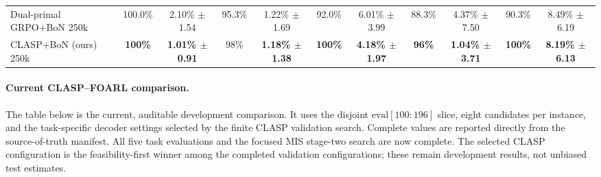 \documentclass{article}
\theoremstyle{remark}
\begin{document}
\begin{table}[t]
{\begin{tabular}{lcccccccccc}
Dual-primal GRPO+BoN 250k & 100.0\% & 2.10\% $\pm$ 1.54 & 95.3\% & 1.22\% $\pm$ 1.69 & 92.0\% & 6.01\% $\pm$ 3.99 & 88.3\% & 4.37\% $\pm$ 7.50 & 90.3\% & 8.49\% $\pm$ 6.19 \\
CLASP+BoN (ours) 250k & \textbf{100\%} & \textbf{1.01\% $\pm$ 0.91} & 98\% & \textbf{1.18\% $\pm$ 1.38} & \textbf{100\%} & \textbf{4.18\% $\pm$ 1.97} & \textbf{96\%} & \textbf{1.04\% $\pm$ 3.71} & \textbf{100\%} & \textbf{8.19\% $\pm$ 6.13} \\
\bottomrule
\end{tabular}%
}
\end{table}

\paragraph{Current CLASP--FOARL comparison.}
The table below is the current, auditable development comparison. It uses the
disjoint \(\mathrm{eval}[100{:}196]\) slice, eight candidates per instance, and
the task-specific decoder settings selected by the finite CLASP validation
search. Complete values are reported directly from the source-of-truth
manifest. All five task evaluations and the focused MIS stage-two search are
now complete. The selected CLASP configuration is the feasibility-first winner
among the completed validation configurations; these remain development
results, not unbiased test estimates.
\end{document}
